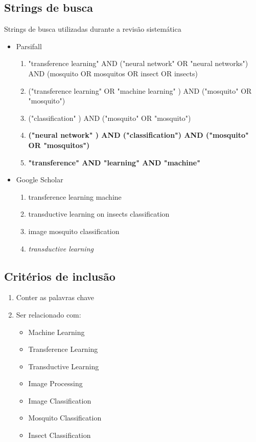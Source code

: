 \documentclass[conference]{IEEEtran}
\begin{document}
\subsection{Strings de busca}
\label{cap:string_busca}
Strings de busca utilizadas durante a revisão sistemática

\begin{itemize}

    \item Parsifall
    \begin{enumerate}
        \item "transference learning" AND ("neural network" OR "neural networks") AND (mosquito OR mosquitos OR insect OR insects)
        
        \item ("transference learning" OR "machine learning" ) AND ("mosquito" OR "mosquito")
        
        \item ("classification" ) AND ("mosquito" OR "mosquito")
    
        \item \textbf{("neural network" ) AND ("classification") AND ("mosquito" OR "mosquitos")}
    
        \item \textbf{"transference" AND "learning" AND "machine"}
        

    \end{enumerate}

    \item Google Scholar
    \begin{enumerate}
        \item transference learning machine 
        \item transductive learning on insects classification
        \item image mosquito classification
        \item \emph{transductive learning}
    \end{enumerate}
    
\end{itemize}

\subsection{Critérios de inclusão}
\label{cap:crit_inclusao}
\begin{enumerate}
    \item Conter as palavras chave
    \item Ser relacionado com: 
    \begin{itemize}
        \item Machine Learning
        \item Transference Learning
        \item Transductive Learning
        \item Image Processing
        \item Image Classification
        \item Mosquito Classification
        \item Insect Classification
    \end{itemize}
\end{enumerate}
\end{document}
